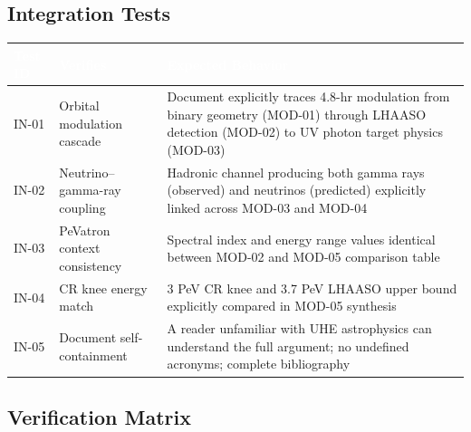 \documentclass[11pt,letterpaper]{article}
\newcommand{\tableheader}[1]{\textbf{\sffamily\textcolor{white}{#1}}}
\begin{document}
\subsection{Integration Tests}

\begin{center}
\begin{tabularx}{\textwidth}{C{1.5cm}L{3.5cm}X}
\toprule
{}
\tableheader{Test ID} & \tableheader{Verifies} & \tableheader{Expected Behavior} \\
\midrule
IN-01 & Orbital modulation cascade & Document explicitly traces 4.8-hr modulation from binary geometry (MOD-01) through LHAASO detection (MOD-02) to UV photon target physics (MOD-03) \\
IN-02 & Neutrino--gamma-ray coupling & Hadronic channel producing both gamma rays (observed) and neutrinos (predicted) explicitly linked across MOD-03 and MOD-04 \\
IN-03 & PeVatron context consistency & Spectral index and energy range values identical between MOD-02 and MOD-05 comparison table \\
IN-04 & CR knee energy match & 3 PeV CR knee and 3.7 PeV LHAASO upper bound explicitly compared in MOD-05 synthesis \\
IN-05 & Document self-containment & A reader unfamiliar with UHE astrophysics can understand the full argument; no undefined acronyms; complete bibliography \\
\bottomrule
\end{tabularx}
\end{center}

\subsection{Verification Matrix}
\end{document}
